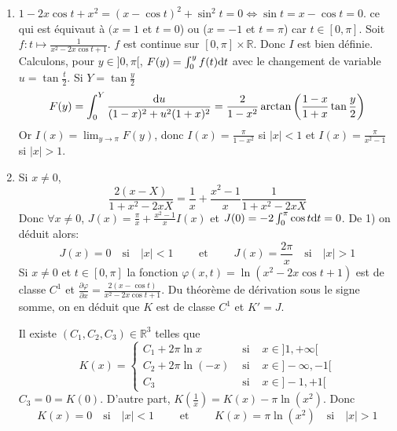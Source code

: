 \documentclass{article}[11pt]
\def \de {{\rm d}}
\begin{document}
\begin{enumerate}
\item $1-2x\cos t+x^2=(x-\cos t)^2+\sin^2t=0\Longleftrightarrow \sin t=x-\cos t=0$. ce qui est équivaut à $(x=1$ et $t=0$) ou ($x=-1$ et $t=\pi$) car $t\in[0,\pi]$.
Soit $f:t\mapsto \frac{1}{x^2-2x\cos t+1}$. $f$ est continue sur $[0,\pi]\times\mathbb{R}$. Donc $I$ est bien définie. Calculons, pour $y\in]0,\pi[$, $F(y)=\int_0^yf(t)\de t$ avec le changement de variable $u=\tan\frac t2$. Si $Y=\tan\frac y2$
\[F(y)=\int_0^Y\frac{\de u}{(1-x)^2+u^2(1+x)^2}=\frac{2}{1-x^2}\arctan\left(\frac{1-x}{1+x}\tan\frac y2\right)\]
Or $I(x)=\lim_{y\to\pi}F(y)$, donc $I(x)=\frac{\pi}{1-x^2}$ si $|x|<1$ et $I(x)=\frac{\pi}{x^2-1}$ si $|x|>1$.
\item Si $x\neq 0$,
\[\frac{2(x-X)}{1+x^2-2xX}=\frac 1x+\frac{x^2-1}{x}\frac{1}{1+x^2-2xX}\]
Donc $\forall x\neq 0$, $J(x)=\frac{\pi}{x}+\frac{x^2-1}{x}I(x)$ et $J(0)=-2\int_0^\pi\cos t\de t=0$. De 1) on déduit alors: 
\[J(x)=0\quad \mbox{si} \quad |x|<1\qquad \mbox{ et } \qquad J(x)=\frac{2\pi}{x}\quad \mbox{si} \quad |x|>1\]
Si $x\neq 0$ et $t\in[0,\pi]$ la fonction $\varphi(x,t)=\ln(x^2-2x\cos t+1)$ est de classe $C^1$ et $\displaystyle \frac{\partial \varphi}{\partial x}=\frac{2(x-\cos t)}{x^2-2x\cos t+1}$. Du théorème de dérivation sous le signe somme, on en déduit que $K$ est de classe $C^1$ et $K'=J$. 

Il existe $(C_1,C_2,C_3)\in\mathbb{R}^3$ telles que 
\[K(x)=\left\{\begin{array}{lcl}
C_1+2\pi\ln x &\mbox{ si } & x\in]1,+\infty[ \\
C_2+2\pi\ln(-x) &\mbox{ si } & x\in]-\infty,-1[ \\
C_3 &\mbox{ si } & x\in]-1,+1[ 
\end{array}\right.
\]
$C_3=0=K(0)$. D'autre part, $K(\frac 1x)=K(x)-\pi\ln(x^2)$.
Donc
\[K(x)=0\quad \mbox{si} \quad |x|<1\qquad \mbox{ et } \qquad K(x)=\pi\ln(x^2)\quad \mbox{si} \quad |x|>1\]

\end{enumerate}
\end{document}
